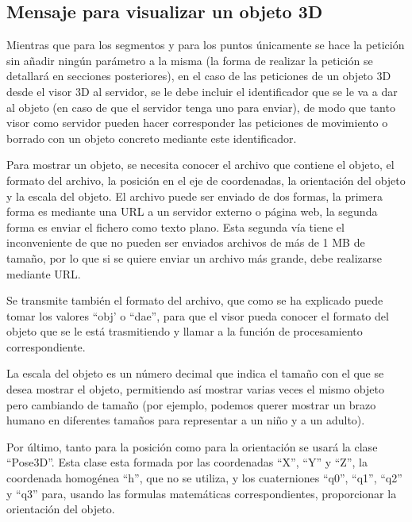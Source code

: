 \subsection{Mensaje para visualizar un objeto 3D}
Mientras que para los segmentos y para los puntos únicamente se hace la petición sin añadir ningún parámetro a la misma (la forma de realizar la petición se detallará en secciones posteriores), en el caso de las peticiones de un objeto 3D desde el visor 3D al servidor, se le debe incluir el identificador que se le va a dar al objeto (en caso de que el servidor tenga uno para enviar), de modo que tanto visor como servidor pueden hacer corresponder las peticiones de movimiento o borrado con un objeto concreto mediante este identificador.

Para mostrar un objeto, se necesita conocer el archivo que contiene el objeto, el formato del archivo, la posición en el eje de coordenadas, la orientación del objeto y la escala del objeto. 
El archivo puede ser enviado de dos formas, la primera forma es mediante una URL a un servidor externo o página web, la segunda forma es enviar el fichero como texto plano. Esta segunda vía tiene el inconveniente de que no pueden ser enviados archivos de más de 1 MB de tamaño, por lo que si se quiere enviar un archivo más grande, debe realizarse mediante URL.

Se transmite también el formato del archivo, que como se ha explicado puede tomar los valores ``obj' o ``dae'', para que el visor pueda conocer el formato del objeto que se le está trasmitiendo y llamar a la función de procesamiento correspondiente.

La escala del objeto es un número decimal que indica el tamaño con el que se desea mostrar el objeto, permitiendo así mostrar varias veces el mismo objeto pero cambiando de tamaño (por ejemplo, podemos querer mostrar un brazo humano en diferentes tamaños para representar a un niño y a un adulto).

Por último, tanto para la posición como para la orientación se usará la clase ``Pose3D''. Esta clase esta formada por las coordenadas ``X'', ``Y'' y ``Z'', la coordenada homogénea ``h'', que no se utiliza, y los cuaterniones ``q0'', ``q1'', ``q2'' y ``q3'' para, usando las formulas matemáticas correspondientes, proporcionar la orientación del objeto.

